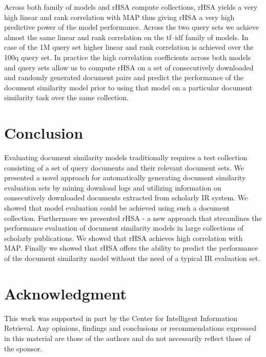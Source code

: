 \documentclass[letterpaper]{article}
\begin{document}
Across both family of models and rHSA compute collections, rHSA yields a very high linear and rank correlation with MAP thus giving rHSA a very high predictive power of the model performance. Across the two query sets we achieve almost the same linear and rank correlation on the tf--idf family of models. In case of the 1M query set higher linear and rank correlation is achieved over the 100q query set. In practice the high correlation coefficients across both models and query sets allow us to compute rHSA on a set of consecutively downloaded and randomly generated document pairs and predict the performance of the document similarity model prior to using that model on a particular document similarity task over the same collection.

\section{Conclusion}

Evaluating document similarity models traditionally requires a test collection consisting of a set of query documents and their relevant document sets. We presented a novel approach for automatically generating document similarity evaluation sets by mining download logs and utilizing information on consecutively downloaded documents extracted from scholarly IR system. We showed that model evaluation could be achieved using such a document collection. Furthermore we presented rHSA - a new approach that streamlines the performance evaluation of document similarity models in large collections of scholarly publications. We showed that rHSA achieves high correlation with MAP. Finally we showed that rHSA offers the ability to predict the performance of the document similarity model without the need of a typical IR evaluation set.

\section{Acknowledgment}
This work was supported in part by the Center for Intelligent Information Retrieval. Any opinions, findings and conclusions or recommendations expressed in this material are those of the authors and do not necessarily reflect those of the sponsor.


\fontsize{9.5pt}{10.5pt}\selectfont
 
\end{document}
